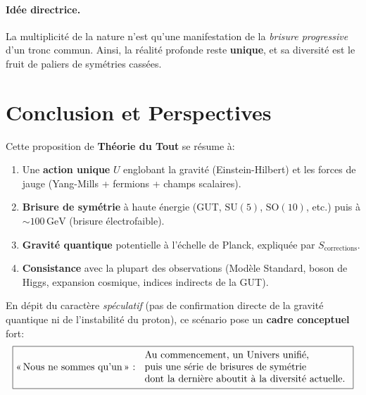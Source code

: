 \documentclass[12pt]{article}
\begin{document}
\paragraph{Id\'ee directrice.}
La \og multiplicité\fg{} de la nature n'est qu'une manifestation de la \emph{brisure progressive} 
d'un tronc commun. Ainsi, la r\'ealit\'e profonde reste \textbf{unique}, et sa diversit\'e 
est le fruit de paliers de sym\'etries cass\'ees.

\section{Conclusion et Perspectives}

\noindent
Cette proposition de \textbf{Th\'eorie du Tout} se r\'esume \`a:
\begin{enumerate}
\item Une \textbf{action unique} $U$ englobant la gravit\'e (Einstein-Hilbert) 
      et les forces de jauge (Yang-Mills + fermions + champs scalaires).  
\item \textbf{Brisure de sym\'etrie} \`a haute \'energie (GUT, $\mathrm{SU}(5)$, $\mathrm{SO}(10)$, etc.) 
      puis \`a $\sim100\,\mathrm{GeV}$ (brisure \'electrofaible).  
\item \textbf{Gravit\'e quantique} potentielle \`a l'\'echelle de Planck, 
      expliqu\'ee par $S_{\text{corrections}}$.  
\item \textbf{Consistance} avec la plupart des observations (Mod\`ele Standard, boson de Higgs, 
      expansion cosmique, indices indirects de la GUT).
\end{enumerate}

\noindent
En d\'epit du caract\`ere \emph{sp\'eculatif} (pas de confirmation directe 
de la gravit\'e quantique ni de l'instabilit\'e du proton), 
ce sc\'enario pose un \textbf{cadre conceptuel} fort:
\[
\boxed{
\text{«\,Nous ne sommes qu’un\,» : } 
\begin{array}{l}
\text{Au commencement, un Univers unifi\'e,}\\
\text{puis une s\'erie de brisures de sym\'etrie}\\
\text{dont la derni\`ere aboutit \`a la diversit\'e actuelle.}
\end{array}
}
\]

\bigskip
\end{document}
